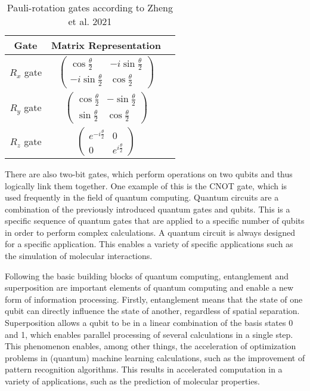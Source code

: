 \begin{table}[h!]
    \centering
    \captionsetup{justification=centering}
    \begin{tabular}{ccc}
    \hline
    \textbf{Gate} & \textbf{Matrix Representation} \\ 
    \hline
    $R_x$ gate & $\begin{pmatrix} \cos\frac{\theta}{2} & -i\sin\frac{\theta}{2} \\ -i\sin\frac{\theta}{2} & \cos\frac{\theta}{2} \end{pmatrix}$ \\ 
    $R_y$ gate & $\begin{pmatrix} \cos\frac{\theta}{2} & -\sin\frac{\theta}{2} \\ \sin\frac{\theta}{2} & \cos\frac{\theta}{2} \end{pmatrix}$ \\ 
    $R_z$ gate & $\begin{pmatrix} e^{-i\frac{\theta}{2}} & 0 \\ 0 & e^{i\frac{\theta}{2}} \end{pmatrix}$ \\ 
    \hline
    \end{tabular}
    \caption[Pauli-rotation gates according to Zheng et al. 2021]{\label{tab:pauligates} Pauli-rotation gates according to Zheng et al. 2021 \cite{zheng2021quantum}}
\end{table}

There are also two-bit gates, which perform operations on two qubits and thus logically link them together. One example of this is the CNOT gate, which is used frequently in the field of quantum computing. \cite{zheng2021quantum} Quantum circuits are a combination of the previously introduced quantum gates and qubits. This is a specific sequence of quantum gates that are applied to a specific number of qubits in order to perform complex calculations. A quantum circuit is always designed for a specific application. This enables a variety of specific applications such as the simulation of molecular interactions. \cite{claudino2022basics} 

Following the basic building blocks of quantum computing, entanglement and superposition are important elements of quantum computing and enable a new form of information processing. Firstly, entanglement means that the state of one qubit can directly influence the state of another, regardless of spatial separation. Superposition allows a qubit to be in a linear combination of the basis states 0 and 1, which enables parallel processing of several calculations in a single step. This phenomenon enables, among other things, the acceleration of optimization problems in (quantum) machine learning calculations, such as the improvement of pattern recognition algorithms. This results in accelerated computation in a variety of applications, such as the prediction of molecular properties. \cite{dunjko2017machine} 

